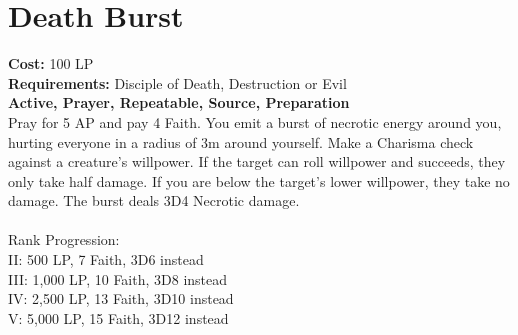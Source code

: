 \section{Death Burst}\label{prayer:deathBurst}
\textbf{Cost:} 100 LP\\
\textbf{Requirements:} Disciple of Death, Destruction or Evil \\
\textbf{Active, Prayer, Repeatable, Source, Preparation}\\
Pray for 5 AP and pay 4 Faith.
You emit a burst of necrotic energy around you, hurting everyone in a radius of 3m around yourself.
Make a Charisma check against a creature's willpower.
If the target can roll willpower and succeeds, they only take half damage.
If you are below the target's lower willpower, they take no damage.
The burst deals 3D4 Necrotic damage.\\
\\
Rank Progression:\\
II: 500 LP, 7 Faith, 3D6 instead\\
III: 1,000 LP, 10 Faith, 3D8 instead\\
IV: 2,500 LP, 13 Faith, 3D10 instead\\
V: 5,000 LP, 15 Faith, 3D12 instead\\